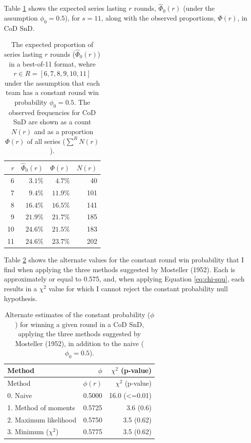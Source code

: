 \documentclass{article}
\begin{document}
Table \ref{tbl:cod-prob-series-lasting-r-rounds} shows the expected
series lasting \(r\) rounds, \(\hat{\Phi}_0(r)\) (under the assumption
\(\phi_0 = 0.5\)), for \(s = 11\), along with the observed proportions,
\(\Phi(r)\), in CoD SnD.

\begin{longtable}{rrrr}
\caption{The expected proportion of series lasting $r$ rounds ($\hat{\Phi}_0(r)$) in a best-of-11 format, wehre $r \in R = [6, 7, 8, 9, 10, 11]$ under the assumption that each team has a constant round win probability $\phi_0 = 0.5$. The observed frequencies for CoD SnD are shown as a count $N(r)$ and as a proportion $\Phi(r)$ of all series ($\sum^R N(r)$).}\label{tbl:cod-prob-series-lasting-r-rounds} \\
\toprule
$r$ & $\hat{\Phi}_0(r)$ & $\Phi(r)$ & $N(r)$ \\ 
\midrule
6 & $3.1\%$ & $4.7\%$ & 40 \\ 
7 & $9.4\%$ & $11.9\%$ & 101 \\ 
8 & $16.4\%$ & $16.5\%$ & 141 \\ 
9 & $21.9\%$ & $21.7\%$ & 185 \\ 
10 & $24.6\%$ & $21.5\%$ & 183 \\ 
11 & $24.6\%$ & $23.7\%$ & 202 \\ 
\bottomrule
\end{longtable}

Table \ref{tbl:mosteller-methods-results} shows the alternate values for
the constant round win probability that I find when applying the three
methods suggested by Mosteller (1952). Each is approximately or equal to
0.575, and, when applying Equation \ref{eq:chi-squ}, each results in a
\(\chi^2\) value for which I cannot reject the constant probability null
hypothesis.

\begin{longtable}[]{@{}lrr@{}}
\caption{Alternate estimates of the constant probability ($\phi$) for winning a given round in a CoD SnD, applying the three methods suggested by Mosteller (1952), in addition to the naive ($\phi_0 = 0.5$).}\label{tbl:mosteller-methods-results} \\
\toprule()
Method & $\phi$ & $\chi^2$ (p-value) \\
\midrule()
\endfirsthead
\toprule()
Method & $\phi(r)$ & $\chi^2$ (p-value) \\
\midrule()
\endhead
0. Naive & 0.5000 & 16.0 (\textless=0.01) \\
1. Method of moments & 0.5725 & 3.6 (0.6) \\
2. Maximum likelihood & 0.5750 & 3.5 (0.62) \\
3. Minimum ($\chi^2$) & 0.5775 & 3.5 (0.62) \\
\bottomrule()
\end{longtable}
\end{document}
